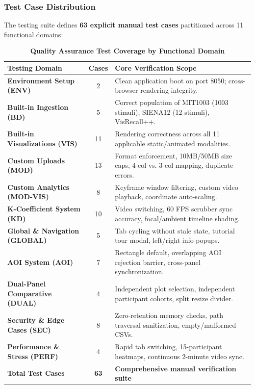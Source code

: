 \documentclass[11pt,a4paper]{article}
\begin{document}
\subsubsection{Test Case Distribution}
The testing suite defines \textbf{63 explicit manual test cases} partitioned across 11 functional domains:
\begin{table}[H]
    \centering
    \caption{\textbf{Quality Assurance Test Coverage by Functional Domain}}
    \label{tab:qa_coverage}
    \footnotesize
    \begin{tabularx}{\linewidth}{l c X}
        \toprule
        \textbf{Testing Domain} & \textbf{Cases} & \textbf{Core Verification Scope} \\
        \midrule
        \textbf{Environment Setup (ENV)} & 2 & Clean application boot on port 8050; cross-browser rendering integrity. \\
        \textbf{Built-in Ingestion (BD)} & 5 & Correct population of MIT1003 (1003 stimuli), SIENA12 (12 stimuli), VisRecall++. \\
        \textbf{Built-in Visualizations (VIS)} & 11 & Rendering correctness across all 11 applicable static/animated modalities. \\
        \textbf{Custom Uploads (MOD)} & 13 & Format enforcement, 10MB/50MB size caps, 4-col vs. 3-col mapping, duplicate errors. \\
        \textbf{Custom Analytics (MOD-VIS)} & 8 & Keyframe window filtering, custom video playback, coordinate auto-scaling. \\
        \textbf{K-Coefficient System (KD)} & 10 & Video switching, 60 FPS scrubber sync accuracy, focal/ambient timeline shading. \\
        \textbf{Global \& Navigation (GLOBAL)} & 5 & Tab cycling without stale state, tutorial tour modal, left/right info popups. \\
        \textbf{AOI System (AOI)} & 7 & Rectangle default, overlapping AOI rejection barrier, cross-panel synchronization. \\
        \textbf{Dual-Panel Comparative (DUAL)} & 4 & Independent plot selection, independent participant cohorts, split resize divider. \\
        \textbf{Security \& Edge Cases (SEC)} & 8 & Zero-retention memory checks, path traversal sanitization, empty/malformed CSVs. \\
        \textbf{Performance \& Stress (PERF)} & 4 & Rapid tab switching, 15-participant heatmaps, continuous 2-minute video sync. \\
        \midrule
        \textbf{Total Test Cases} & \textbf{63} & \textbf{Comprehensive manual verification suite} \\
        \bottomrule
    \end{tabularx}
\end{table}
\end{document}
